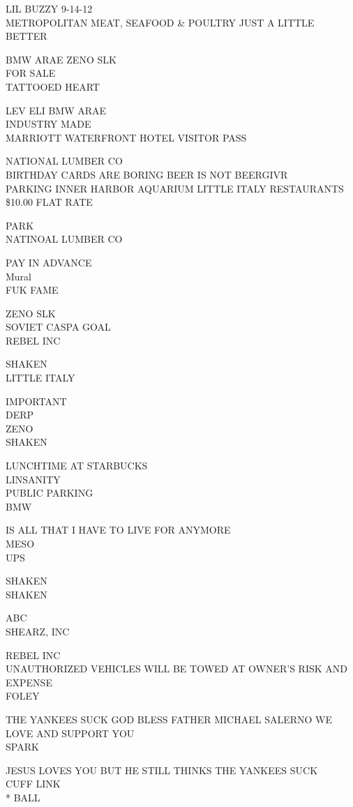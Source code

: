 \documentclass[10pt,letterpaper]{article}
\begin{document}
LIL BUZZY 9{-}14{-}12\\
METROPOLITAN MEAT, SEAFOOD \& POULTRY JUST A LITTLE BETTER

BMW ARAE ZENO SLK\\
FOR SALE\\
TATTOOED HEART

LEV ELI BMW ARAE\\
INDUSTRY MADE\\
MARRIOTT WATERFRONT HOTEL VISITOR PASS

NATIONAL LUMBER CO\\
BIRTHDAY CARDS ARE BORING BEER IS NOT BEERGIVR\\
PARKING INNER HARBOR AQUARIUM LITTLE ITALY RESTAURANTS \$10.00 FLAT RATE

PARK\\
NATINOAL LUMBER CO

PAY IN ADVANCE\\
Mural\\
FUK FAME

ZENO SLK\\
SOVIET CASPA GOAL\\
REBEL INC

SHAKEN\\
LITTLE ITALY

IMPORTANT\\
DERP\\
ZENO\\
SHAKEN

LUNCHTIME AT STARBUCKS\\
LINSANITY\\
PUBLIC PARKING\\
BMW

IS ALL THAT I HAVE TO LIVE FOR ANYMORE\\
MESO\\
UPS

SHAKEN\\
SHAKEN

ABC\\
SHEARZ, INC

REBEL INC\\
UNAUTHORIZED VEHICLES WILL BE TOWED AT OWNER'S RISK AND EXPENSE\\
FOLEY

THE YANKEES SUCK GOD BLESS FATHER MICHAEL SALERNO WE LOVE AND SUPPORT YOU\\
SPARK

JESUS LOVES YOU BUT HE STILL THINKS THE YANKEES SUCK\\
CUFF LINK\\
* BALL
\end{document}

